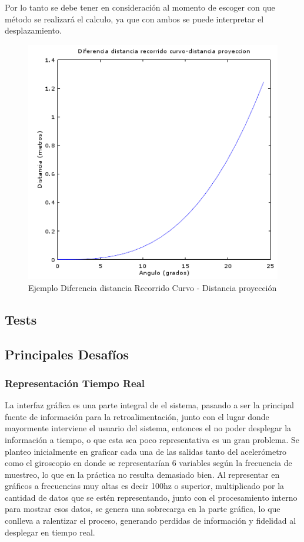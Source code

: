 \documentclass[12pt,a4paper]{article}
\begin{document}
Por lo tanto se debe tener en consideración al momento de escoger con que método se realizará el calculo, ya que con ambos se puede interpretar el desplazamiento.

\begin{figure}[H]
	\centering
	\includegraphics[scale=0.8]{images/DiferenciaRec-Pro}
	\caption{Ejemplo Diferencia distancia Recorrido Curvo - Distancia proyección}
	\label{fig:diferenciarec-pro}
\end{figure}

\subsection{Tests}

\subsection{Principales Desafíos}
\subsubsection{Representación Tiempo Real}
La interfaz gráfica es una parte integral de el sistema, pasando a ser la principal fuente de información para la retroalimentación, junto con el lugar donde mayormente interviene el usuario del sistema, entonces el no poder desplegar la información a tiempo, o que esta sea poco representativa es un gran problema. Se planteo inicialmente en graficar cada una de las salidas tanto del acelerómetro como el giroscopio en donde se representarían 6 variables según la frecuencia de muestreo, lo que en la práctica no resulta demasiado bien. Al representar en gráficos a frecuencias muy altas es decir 100hz o superior, multiplicado por la cantidad de datos que se estén representando, junto con el procesamiento interno para mostrar esos datos, se genera una sobrecarga en la parte gráfica, lo que conlleva a ralentizar el proceso, generando perdidas de información y fidelidad al desplegar en tiempo real.
\end{document}
